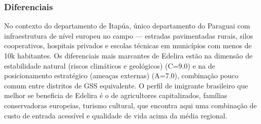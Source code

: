 \subsubsection*{Diferenciais}\label{dif-edelira-0723}
No contexto do departamento de Itapúa, único departamento do Paraguai com infraestrutura de nível europeu no campo — estradas pavimentadas rurais, silos cooperativos, hospitais privados e escolas técnicas em municípios com menos de 10k habitantes. Os diferenciais mais marcantes de Edelira estão na dimensão de estabilidade natural (riscos climáticos e geológicos) (C=9.0) e na de posicionamento estratégico (ameaças externas) (A=7.0), combinação pouco comum entre distritos de GSS equivalente. O perfil de imigrante brasileiro que melhor se beneficia de Edelira é o de agricultores capitalizados, famílias conservadoras europeias, turismo cultural, que encontra aqui uma combinação de custo de entrada acessível e qualidade de vida acima da média regional.
